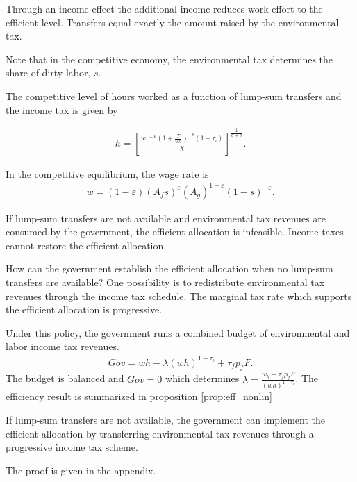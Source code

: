   Through an income effect the additional income reduces work effort to the efficient level. Transfers equal exactly the amount raised by the environmental tax. 

Note that in the competitive economy, the environmental tax determines the share of dirty labor, $s$. 

The competitive level of hours worked as a function of lump-sum transfers and the income tax is given by

\begin{align}
h = \left[\frac{w^{1-\theta}\left(1+\frac{T}{wh}\right)^{-\theta}(1-\tau_{\iota})}{\chi}\right]^{\frac{1}{\sigma+\theta}}.\label{eq:hopt}
\end{align}


In the competitive equilibrium, the wage rate is
\begin{align}
w= (1-\varepsilon)(A_fs)^\varepsilon (A_g)^{1-\varepsilon}(1-s)^{-\varepsilon}. \label{eq:compw}
\end{align}


\begin{prop}
	If lump-sum transfers are not available and environmental tax revenues are consumed by the government, the efficient allocation is infeasible. Income taxes  cannot restore the efficient allocation. 
\end{prop}


How can the government establish the efficient allocation when no lump-sum transfers are available? One possibility is to redistribute environmental tax revenues through the income tax schedule. The marginal tax rate which supports the efficient allocation is progressive. 

Under this policy, the government runs a combined budget of environmental and labor income tax revenues.  
\begin{align}
Gov= wh-\lambda (wh)^{1-\tau_\iota}+\tau_f p_fF.
\end{align}
The budget is balanced and $Gov = 0$ which determines $\lambda=\frac{w_h + \tau_f p_f F}{(wh)^{1-\tau_{\iota}}}$. The efficiency result is summarized in proposition \ref{prop:eff_nonlin}
\begin{prop}\label{prop:eff_nonlin}
	If lump-sum transfers are not available, the government can implement the efficient allocation by  transferring environmental tax revenues through a progressive income tax scheme.
\end{prop}
The proof is given in the appendix. 

